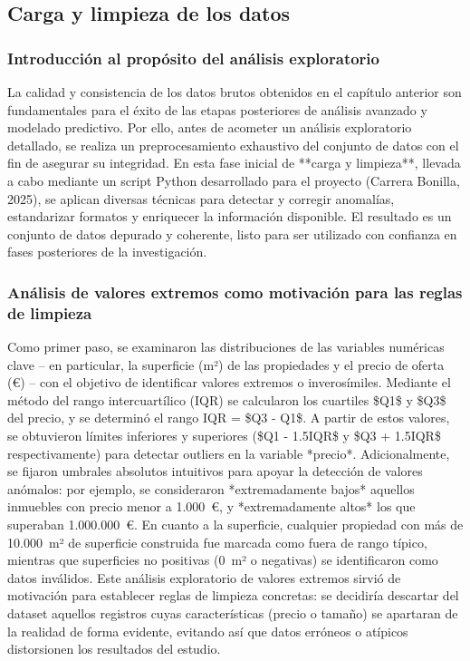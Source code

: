 
\subsection{Carga y limpieza de los datos}

\subsubsection{Introducción al propósito del análisis exploratorio}
La calidad y consistencia de los datos brutos obtenidos en el capítulo anterior son fundamentales para el éxito de las etapas posteriores de análisis avanzado y modelado predictivo. Por ello, antes de acometer un análisis exploratorio detallado, se realiza un preprocesamiento exhaustivo del conjunto de datos con el fin de asegurar su integridad. En esta fase inicial de **carga y limpieza**, llevada a cabo mediante un script Python desarrollado para el proyecto (Carrera Bonilla, 2025), se aplican diversas técnicas para detectar y corregir anomalías, estandarizar formatos y enriquecer la información disponible. El resultado es un conjunto de datos depurado y coherente, listo para ser utilizado con confianza en fases posteriores de la investigación.

\subsubsection{Análisis de valores extremos como motivación para las reglas de limpieza}
Como primer paso, se examinaron las distribuciones de las variables numéricas clave – en particular, la superficie (m²) de las propiedades y el precio de oferta (€) – con el objetivo de identificar valores extremos o inverosímiles. Mediante el método del rango intercuartílico (IQR) se calcularon los cuartiles \$Q1\$ y \$Q3\$ del precio, y se determinó el rango IQR = \$Q3 - Q1\$. A partir de estos valores, se obtuvieron límites inferiores y superiores (\$Q1 - 1.5\cdot IQR\$ y \$Q3 + 1.5\cdot IQR\$ respectivamente) para detectar outliers en la variable *precio*. Adicionalmente, se fijaron umbrales absolutos intuitivos para apoyar la detección de valores anómalos: por ejemplo, se consideraron *extremadamente bajos* aquellos inmuebles con precio menor a 1.000 €, y *extremadamente altos* los que superaban 1.000.000 €. En cuanto a la superficie, cualquier propiedad con más de 10.000 m² de superficie construida fue marcada como fuera de rango típico, mientras que superficies no positivas (0 m² o negativas) se identificaron como datos inválidos. Este análisis exploratorio de valores extremos sirvió de motivación para establecer reglas de limpieza concretas: se decidiría descartar del dataset aquellos registros cuyas características (precio o tamaño) se apartaran de la realidad de forma evidente, evitando así que datos erróneos o atípicos distorsionen los resultados del estudio.

